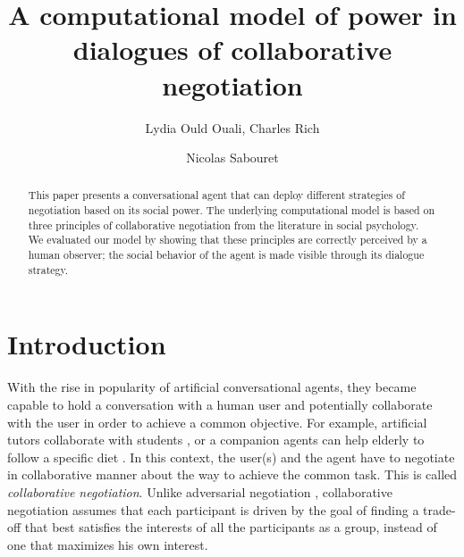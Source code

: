 \documentclass{llncs}
\begin{document}
	\title{\vskip -10pt A computational model of power in dialogues of collaborative negotiation}
	
	\author{Lydia Ould Ouali, Charles Rich \and
		Nicolas Sabouret }
	

	\maketitle
	
	\begin{abstract}
		This paper presents a conversational agent that can deploy different strategies of negotiation based on its social power. The underlying computational model is based on three principles of collaborative negotiation from the literature in social psychology. We evaluated our model by showing that these principles are correctly perceived by a human observer; the social behavior of the agent is made visible through its dialogue strategy.
	\end{abstract}
	
	\section{Introduction}
	With the rise in popularity of artificial conversational agents, they became capable to hold a conversation with a human user and potentially collaborate with the user in order to achieve a common objective. For example, artificial tutors collaborate with students \cite{gulz2011extending}, or a companion agents can help elderly to follow a specific diet \cite{kidd2005sociable}. In this context, the user(s) and the agent have to negotiate in collaborative manner about the way to achieve the common task. This is called \emph{collaborative negotiation}. Unlike adversarial negotiation \cite{traum2008multi}, collaborative negotiation assumes that each participant is driven by the goal of finding a trade-off that best satisfies the interests of all the participants as a group, instead of one that maximizes his own interest\cite{sidnerartificial,chu1995response}.
	
\end{document}
